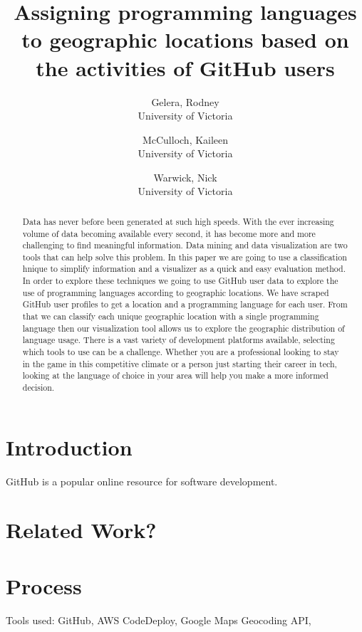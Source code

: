 \documentclass[11pt]{article}
\begin{document}
\title{Assigning programming languages to geographic locations based on the activities of GitHub users}

\author{
   Gelera, Rodney \\University of Victoria
   \and
   McCulloch, Kaileen \\University of Victoria
   \and
   Warwick, Nick \\University of Victoria
}

\maketitle

\tableofcontents
\newpage

\begin{abstract}
Data has never before been generated at such high speeds. With the ever increasing volume of data becoming available every second, it has become more and more challenging to find meaningful information. Data mining and data visualization are two tools that can help solve this problem. In this paper we are going to use a classification hnique to simplify information and a visualizer as a quick and easy evaluation method. In order to explore these techniques we going to use GitHub user data to explore the use of programming languages according to geographic locations. We have scraped GitHub user profiles to get a location and a programming language for each user. From that we can classify each unique geographic location with a single programming language then our visualization tool allows us to explore the geographic distribution of language usage. There is a vast variety of development platforms available, selecting which tools to use can be a challenge. Whether you are a professional looking to stay in the game in this competitive climate or a person just starting their career in tech, looking at the language of choice in your area will help you make a more informed decision.
\end{abstract}

\section{Introduction}
GitHub is a popular online resource for software development. 
\section{Related Work?}
\section{Process}
Tools used: GitHub, AWS CodeDeploy, Google Maps Geocoding API,  
\end{document}
